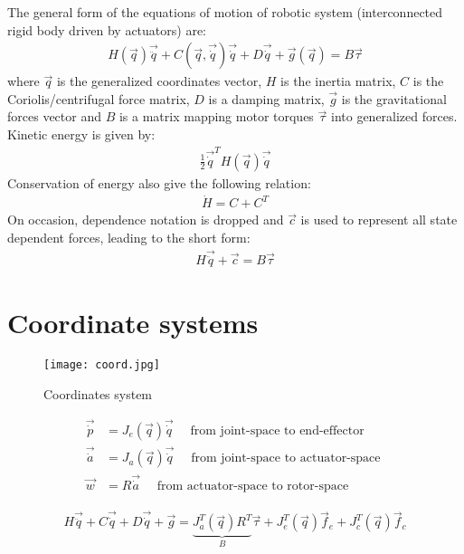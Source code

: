 The general form of the equations of motion of robotic system (interconnected rigid body driven by actuators) are:
%
\begin{align}
H(\vec{q}) \vec{\ddot{q}} + C(\vec{q},\vec{\dot{q}}) \vec{\dot{q}} + D \vec{\dot{q}} + \vec{g}(\vec{q}) = B \vec{\tau} 
\label{eq:manipulator}
\end{align}
%
where $\vec{q}$ is the generalized coordinates vector, $H$ is the inertia matrix, $C$ is the Coriolis/centrifugal force matrix, $D$ is a damping matrix, $\vec{g}$ is the gravitational forces vector and $B$ is a matrix mapping motor torques $\vec{\tau}$ into generalized forces.
%
Kinetic energy is given by:
%
\begin{align}
\frac{1}{2} \vec{\dot{q}}^T H(\vec{q}) \vec{\dot{q}} 
\label{eq:kinetic}
\end{align}
%
Conservation of energy also give the following relation:
%
\begin{align}
\dot{H} = C + C^T
\label{eq:kinetic}
\end{align}
%
On occasion, dependence notation is dropped and $\vec{c}$ is used to represent all state dependent forces, leading to the short form:
%
\begin{align}
H \vec{\ddot{q}} + \vec{c} = B \vec{\tau} 
\label{eq:manipulator_short}
\end{align}

\section{Coordinate systems}
\label{sec:coord}


\begin{figure}[H]
	\centering
		\texttt{[image: coord.jpg]}
	\caption{Coordinates system}
	\label{fig:coord}
\end{figure}

\begin{align}
\vec{\dot{p}}   &= J_e( \vec{q} ) \vec{\dot{q} }  \quad \text{ from joint-space to end-effector   } \\
\vec{\dot{a}}   &= J_a( \vec{q} ) \vec{\dot{q} }  \quad \text{ from joint-space to actuator-space } \\
\vec{w }        &= R              \vec{\dot{a} }  \quad \text{ from actuator-space to rotor-space } 
\label{eq:coord_transform}
\end{align}


\begin{align}
H \vec{\ddot{q}} + C \vec{\dot{q}} + D \vec{\dot{q}} + \vec{g} =  \underbrace{ J_a^T(\vec{q}) R^T }_B  \vec{\tau} + J_e^T(\vec{q}) \vec{f}_e + J_c^T(\vec{q}) \vec{f}_c
\label{eq:manipulator}
\end{align}

